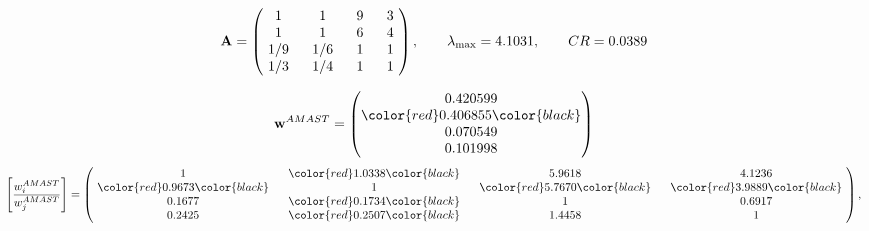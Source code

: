 \begin{example}
\begin{equation*}
\mathbf{A} =
\begin{pmatrix}
$\,\,$ 1 $\,\,$ & $\,\,$1$\,\,$ & $\,\,$9$\,\,$ & $\,\,$3 $\,\,$ \\
$\,\,$ 1 $\,\,$ & $\,\,$ 1 $\,\,$ & $\,\,$6$\,\,$ & $\,\,$4 $\,\,$ \\
$\,\,$ 1/9$\,\,$ & $\,\,$ 1/6$\,\,$ & $\,\,$ 1 $\,\,$ & $\,\,$1 $\,\,$ \\
$\,\,$ 1/3$\,\,$ & $\,\,$ 1/4$\,\,$ & $\,\,$ 1 $\,\,$ & $\,\,$ 1  $\,\,$ \\
\end{pmatrix},
\qquad
\lambda_{\max} =
4.1031,
\qquad
CR = 0.0389
\end{equation*}

\begin{equation*}
\mathbf{w}^{AMAST} =
\begin{pmatrix}
0.420599\\
\color{red} 0.406855\color{black} \\
0.070549\\
0.101998
\end{pmatrix}\end{equation*}
\begin{equation*}
\left[ \frac{{w}^{AMAST}_i}{{w}^{AMAST}_j} \right] =
\begin{pmatrix}
$\,\,$ 1 $\,\,$ & $\,\,$\color{red} 1.0338\color{black} $\,\,$ & $\,\,$5.9618$\,\,$ & $\,\,$4.1236$\,\,$ \\
$\,\,$\color{red} 0.9673\color{black} $\,\,$ & $\,\,$ 1 $\,\,$ & $\,\,$\color{red} 5.7670\color{black} $\,\,$ & $\,\,$\color{red} 3.9889\color{black}   $\,\,$ \\
$\,\,$0.1677$\,\,$ & $\,\,$\color{red} 0.1734\color{black} $\,\,$ & $\,\,$ 1 $\,\,$ & $\,\,$0.6917 $\,\,$ \\
$\,\,$0.2425$\,\,$ & $\,\,$\color{red} 0.2507\color{black} $\,\,$ & $\,\,$1.4458$\,\,$ & $\,\,$ 1  $\,\,$ \\
\end{pmatrix},
\end{equation*}


\end{example}
